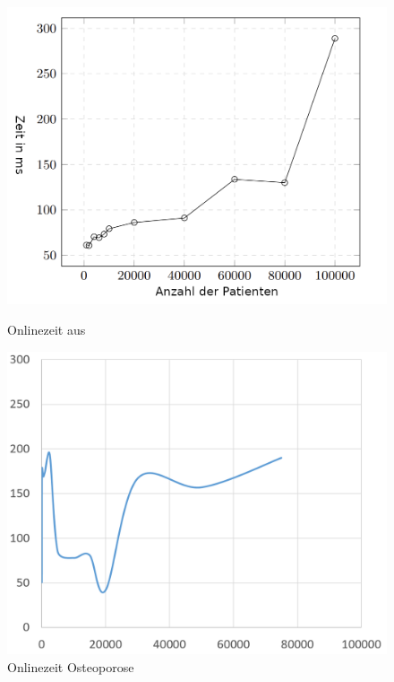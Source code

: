 \documentclass[german,version-2020-11]{uzl-thesis}
\begin{document}
	\begin{figure}[ht]
	\begin{minipage}{.5\textwidth}
		\centering
		\includegraphics[width=0.9\linewidth]{assets/paperLaufzeit.PNG}
		\caption{Onlinezeit aus \cite{guarnieri2017securing}}
		\label{fig:paperlaufzeit}
	\end{minipage}
	\begin{minipage}{.5\textwidth}
		\centering
		\includegraphics[width=0.9\linewidth]{assets/onlineSkript.png}
		\caption{Onlinezeit Osteoporose}
		\label{fig:unserelaufzeit}
	\end{minipage}
\end{figure}
\end{document}
